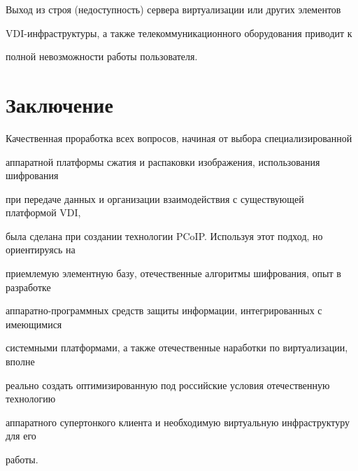        


       Выход из строя (недоступность) сервера виртуализации или других элементов 


VDI-ин\-фра\-струк\-ту\-ры, а также телекоммуникационного оборудования приводит к 


полной невозможности работы пользователя.





\section{Заключение}





       Качественная проработка всех вопросов, начиная от выбора специализированной 


аппаратной платформы сжатия и распаковки изображения, использования шифрования 


при передаче данных и организации взаимодействия с су\-ще\-ст\-ву\-ющей платформой VDI, 


была сделана при создании технологии PCoIP. Используя этот подход, но ориентируясь на 


приемлемую элементную базу, отечественные алгоритмы шифрования, опыт в разработке 


ап\-па\-рат\-но-про\-грам\-мных средств защиты информации, интегрированных с имеющимися 


системными платформами, а также отечественные наработки по виртуализации, вполне 


реально создать оптимизированную под российские условия отечественную технологию 


аппаратного супертонкого клиента и необходимую виртуальную инфраструктуру для его 


работы.






